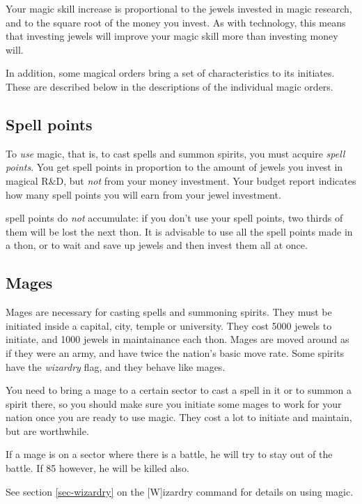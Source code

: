 Your magic skill increase is proportional to the jewels invested in
magic research, and to the square root of the money you invest.  As
with technology, this means that investing jewels will improve your
magic skill more than investing money will.

In addition, some magical orders bring a set of characteristics to
its initiates.  These are described below in the descriptions of the
individual magic orders.

\subsection{Spell points}

To {\em use} magic, that is, to cast spells and summon spirits, you
must acquire {\em spell points}. You get spell points in proportion to
the amount of jewels you invest in magical R\&D, but {\em not}
from your money investment.  Your budget report indicates how many
spell points you will earn from your jewel investment.

 spell points do {\em not} accumulate: if you don't use
your spell points, two thirds of them will be lost the next thon. It
is advisable to use all the spell points made in a thon, or to wait
and save up jewels and then invest them all at once.

\subsection{Mages}

Mages are necessary for casting spells and summoning spirits.  They
must be initiated inside a capital, city, temple or university.  They
cost 5000 jewels to initiate, and 1000 jewels in maintainance each
thon. Mages are moved around as if they were an army, and have twice
the nation's basic move rate. Some spirits have the {\em wizardry} flag,
and they behave like mages.

You need to bring a mage to a certain sector to cast a spell in it or
to summon a spirit there, so you should make sure you initiate some
mages to work for your nation once you are ready to use magic.  They
cost a lot to initiate and maintain, but are worthwhile.

If a mage is on a sector where there is a battle, he will try to stay
out of the battle.  If 85%
however, he will be killed also.

See section \ref{sec-wizardry} on the [W]izardry command for details
on using magic.

